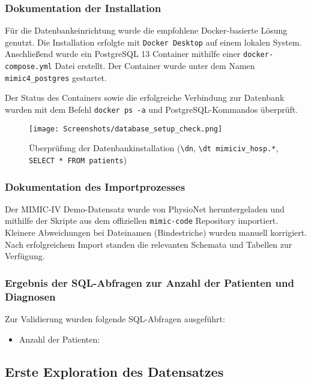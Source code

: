 \documentclass[12pt]{article}
\begin{document}
\subsubsection{Dokumentation der Installation}
Für die Datenbankeinrichtung wurde die empfohlene Docker-basierte Lösung genutzt. Die Installation erfolgte mit \texttt{Docker Desktop} auf einem lokalen System. Anschließend wurde ein PostgreSQL 13 Container mithilfe einer \texttt{docker-compose.yml} Datei erstellt. Der Container wurde unter dem Namen \texttt{mimic4\_postgres} gestartet.

Der Status des Containers sowie die erfolgreiche Verbindung zur Datenbank wurden mit dem Befehl \texttt{docker ps -a} und PostgreSQL-Kommandos überprüft.

\begin{figure}[h]
\centering
\texttt{[image: Screenshots/database\_setup\_check.png]}
\caption{Überprüfung der Datenbankinstallation (\texttt{\textbackslash dn}, \texttt{\textbackslash dt mimiciv\_hosp.*}, \texttt{SELECT * FROM patients})}
\end{figure}

\subsubsection{Dokumentation des Importprozesses}
Der MIMIC-IV Demo-Datensatz wurde von PhysioNet heruntergeladen und mithilfe der Skripte aus dem offiziellen \texttt{mimic-code} Repository importiert. Kleinere Abweichungen bei Dateinamen (Bindestriche) wurden manuell korrigiert. Nach erfolgreichem Import standen die relevanten Schemata und Tabellen zur Verfügung.

\subsubsection{Ergebnis der SQL-Abfragen zur Anzahl der Patienten und Diagnosen}
Zur Validierung wurden folgende SQL-Abfragen ausgeführt:

\begin{itemize}
    \item Anzahl der Patienten:

\end{itemize}

\vspace{0.5cm}

\subsection{ Erste Exploration des Datensatzes}
\end{document}
